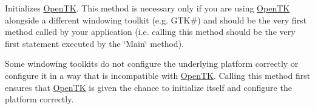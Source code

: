 Initializes \hyperlink{namespace_open_t_k}{Open\-T\-K}. This method is necessary only if you are using \hyperlink{namespace_open_t_k}{Open\-T\-K} alongside a different windowing toolkit (e.\-g. G\-T\-K\#) and should be the very first method called by your application (i.\-e. calling this method should be the very first statement executed by the \char`\"{}\-Main\char`\"{} method). 

Some windowing toolkits do not configure the underlying platform correctly or configure it in a way that is incompatible with \hyperlink{namespace_open_t_k}{Open\-T\-K}. Calling this method first ensures that \hyperlink{namespace_open_t_k}{Open\-T\-K} is given the chance to initialize itself and configure the platform correctly. 